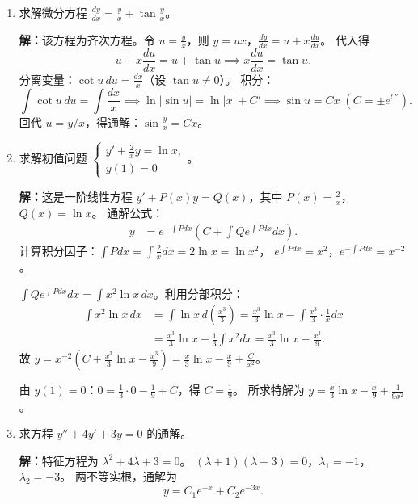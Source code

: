 \documentclass[12pt,a4paper]{ctexart}
\begin{document}
\begin{enumerate}[leftmargin=*,label=\arabic*.,start=28]
  \item 求解微分方程 $\displaystyle\frac{dy}{dx} = \frac{y}{x} + \tan\frac{y}{x}$。

    \textbf{解：}该方程为齐次方程。令 $u = \frac{y}{x}$，则 $y = ux$，$\frac{dy}{dx} = u + x\frac{du}{dx}$。
    代入得
    \[
    u + x\frac{du}{dx} = u + \tan u \implies x\frac{du}{dx} = \tan u.
    \]
    分离变量：$\cot u \, du = \frac{dx}{x}$（设 $\tan u \neq 0$）。
    积分：
    \[
    \int \cot u \, du = \int \frac{dx}{x}
    \implies \ln|\sin u| = \ln|x| + C'
    \implies \sin u = Cx \;(C = \pm e^{C'}).
    \]
    回代 $u = y/x$，得通解：$\sin\frac{y}{x} = Cx$。

  \item 求解初值问题 $\begin{cases} y' + \frac{2}{x}y = \ln x, \\ y(1) = 0 \end{cases}$。

    \textbf{解：}这是一阶线性方程 $y' + P(x)y = Q(x)$，其中 $P(x) = \frac{2}{x}$，$Q(x) = \ln x$。
    通解公式：
    \begin{align*}
      y &= e^{-\int P dx}\left(C + \int Q e^{\int P dx} dx\right).
    \end{align*}
    计算积分因子：$\int P dx = \int \frac{2}{x} dx = 2\ln x = \ln x^2$，
    $e^{\int P dx} = x^2$，$e^{-\int P dx} = x^{-2}$。

    $\int Q e^{\int P dx} dx = \int x^2 \ln x \, dx$。利用分部积分：
    \begin{align*}
      \int x^2 \ln x \, dx
      &= \int \ln x \, d\!\left(\frac{x^3}{3}\right)
       = \frac{x^3}{3}\ln x - \int \frac{x^3}{3} \cdot \frac{1}{x} dx \\
      &= \frac{x^3}{3}\ln x - \frac{1}{3}\int x^2 dx
       = \frac{x^3}{3}\ln x - \frac{x^3}{9}.
    \end{align*}
    故 $y = x^{-2}\!\left(C + \frac{x^3}{3}\ln x - \frac{x^3}{9}\right)
         = \frac{x}{3}\ln x - \frac{x}{9} + \frac{C}{x^2}$。

    由 $y(1)=0$：$0 = \frac{1}{3}\cdot 0 - \frac{1}{9} + C$，得 $C = \frac{1}{9}$。
    所求特解为 $y = \frac{x}{3}\ln x - \frac{x}{9} + \frac{1}{9x^2}$。

  \item 求方程 $y'' + 4y' + 3y = 0$ 的通解。

    \textbf{解：}特征方程为 $\lambda^2 + 4\lambda + 3 = 0$。
    $(\lambda+1)(\lambda+3) = 0$，$\lambda_1 = -1$，$\lambda_2 = -3$。
    两不等实根，通解为
    \[
    y = C_1 e^{-x} + C_2 e^{-3x}.
    \]


\end{enumerate}
\end{document}
